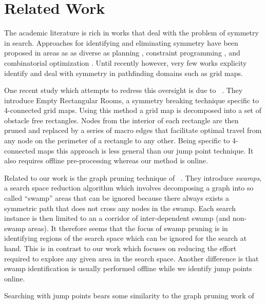 \section{Related Work}
\label{sec:relatedwork}
The academic literature is rich in works that deal with the problem of symmetry
in search.  Approaches for identifying and eliminating symmetry have been
proposed in areas as as diverse as planning \cite{fox99}, constraint programming
\cite{gent00}, and combinatorial optimization \cite{fukunaga08}. Until recently
however, very few works explicity identify and deal with symmetry in pathfinding
domains such as grid maps.
\par
One recent study which attempts to redress this oversight is due to
\citeauthor{harabor10}~.  They introduce Empty Rectangular
Rooms, a symmetry breaking technique specific to 4-connected grid maps.  Using
this method a grid map is  decomposed into a set of obstacle free rectangles.
Nodes from the interior of each rectangle are then pruned and replaced by a
series of macro edges that facilitate optimal travel from any node on the
perimeter of a rectangle to any other.  Being specific to 4-connected maps this
approach is less general than our jump point technique. It also requires offline
pre-processing whereas our method is online.
\par
Related to our work is the graph pruning technique of
\citeauthor{pochter10}~.  They introduce \emph{swamps}, a
search space reduction algorithm which involves decomposing a graph into so
called ``swamp'' areas that can be ignored because there always exists a
symmetric path that does not cross any nodes in the swamp.  Each search instance
is then limited to an a corridor of inter-dependent swamp (and non-swamp areas).
It therefore seems that the focus of swamp pruning is in identifying regions of
the search space which can be ignored for the search at hand.  This is in
contrast to our work which focuses on reducing the effort required to explore
any given area in the search space.  Another difference is that swamp
identification is usually performed offline while we identify jump points
online.
\par
Searching with jump points bears some similarity to the graph pruning work of
